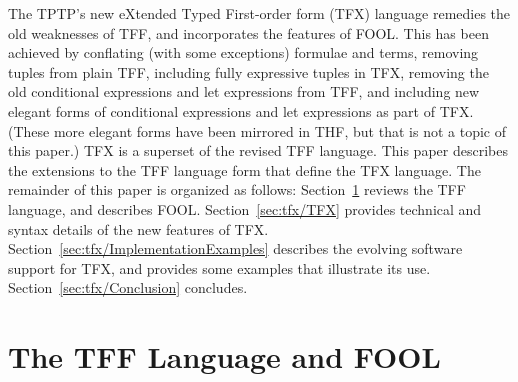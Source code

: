 The TPTP's new eXtended Typed First-order form (TFX) language remedies the
old weaknesses of TFF, and incorporates the features of FOOL.
This has been achieved by conflating (with some exceptions) formulae and 
terms, removing tuples from plain TFF, including fully expressive tuples in 
TFX, removing the old conditional expressions and let expressions from 
TFF, and including new elegant forms of conditional expressions and let 
expressions as part of TFX. 
(These more elegant forms have been mirrored in THF, but that is not a topic of
this paper.)
TFX is a superset of the revised TFF language. 
This paper describes the extensions to the TFF language form that define the 
TFX language.
The remainder of this paper is organized as follows:
Section~\ref{sec:tfx/TPTPFOOL} reviews the TFF language, and describes FOOL.
Section~\ref{sec:tfx/TFX} provides technical and syntax details of the new features 
of TFX.
Section~\ref{sec:tfx/ImplementationExamples} describes the evolving software 
support for TFX, and provides some examples that illustrate its use.
Section~\ref{sec:tfx/Conclusion} concludes.

\section{The TFF Language and FOOL}
\label{sec:tfx/TPTPFOOL}

